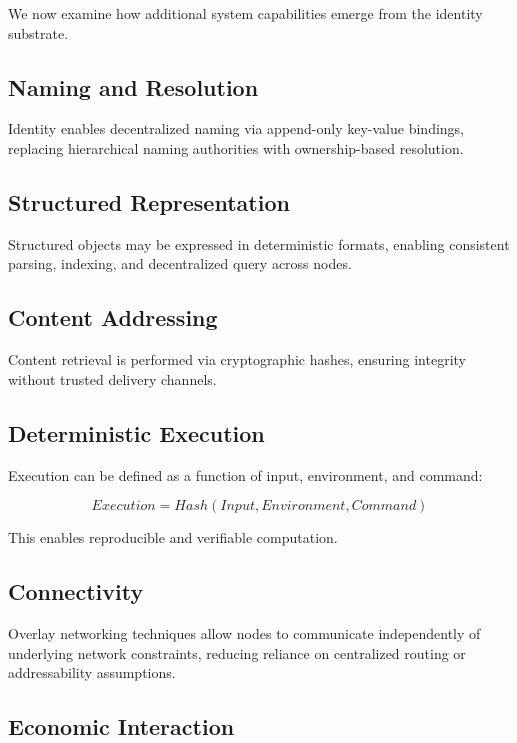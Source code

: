 \documentclass[11pt,a4paper]{article}
\begin{document}
We now examine how additional system capabilities emerge from the identity substrate.

\subsection{Naming and Resolution}

Identity enables decentralized naming via append-only key-value bindings, replacing hierarchical naming authorities with ownership-based resolution.

\subsection{Structured Representation}

Structured objects may be expressed in deterministic formats, enabling consistent parsing, indexing, and decentralized query across nodes.

\subsection{Content Addressing}

Content retrieval is performed via cryptographic hashes, ensuring integrity without trusted delivery channels.

\subsection{Deterministic Execution}

Execution can be defined as a function of input, environment, and command:

\begin{equation}
Execution = Hash(Input, Environment, Command)
\end{equation}

This enables reproducible and verifiable computation.

\subsection{Connectivity}

Overlay networking techniques allow nodes to communicate independently of underlying network constraints, reducing reliance on centralized routing or addressability assumptions.

\subsection{Economic Interaction}
\end{document}
